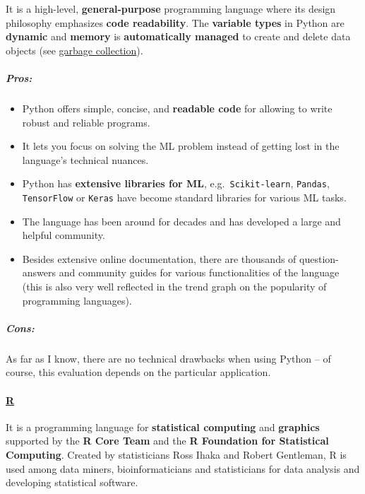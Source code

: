 \documentclass [oneside,10pt,a4paper,ngerman,BCOR10mm,headsepline,parindent,final]{scrartcl}
\providecommand{\tightlist}{%
      \setlength{\itemsep}{0pt}\setlength{\parskip}{0pt}}
\begin{document}
It is a high-level, \textbf{general-purpose} programming language where
its design philosophy emphasizes \textbf{code readability}. The
\textbf{variable types} in Python are \textbf{dynamic} and
\textbf{memory} is \textbf{automatically managed} to create and delete
data objects (see
\href{https://en.wikipedia.org/wiki/Garbage_collection_(computer_science)}{garbage
collection}).

\hypertarget{pros}{%
\subparagraph{Pros:}\label{pros}}

\begin{itemize}
\tightlist
\item
  Python offers simple, concise, and \textbf{readable code} for allowing
  to write robust and reliable programs.
\item
  It lets you focus on solving the ML problem instead of getting lost in
  the language's technical nuances.
\item
  Python has \textbf{extensive libraries for ML},
  e.g.~\texttt{Scikit-learn}, \texttt{Pandas}, \texttt{TensorFlow} or
  \texttt{Keras} have become standard libraries for various ML tasks.
\item
  The language has been around for decades and has developed a large and
  helpful community.
\item
  Besides extensive online documentation, there are thousands of
  question-answers and community guides for various functionalities of
  the language (this is also very well reflected in the trend graph on
  the popularity of programming languages).
\end{itemize}

\hypertarget{cons}{%
\subparagraph{Cons:}\label{cons}}

As far as I know, there are no technical drawbacks when using Python --
of course, this evaluation depends on the particular application.

    \hypertarget{r}{%
\paragraph{\texorpdfstring{\href{https://en.wikipedia.org/wiki/R_(programming_language)}{R}}{R}}\label{r}}

It is a programming language for \textbf{statistical computing} and
\textbf{graphics} supported by the \textbf{R Core Team} and the
\textbf{R Foundation for Statistical Computing}. Created by
statisticians Ross Ihaka and Robert Gentleman, R is used among data
miners, bioinformaticians and statisticians for data analysis and
developing statistical software.
\end{document}
